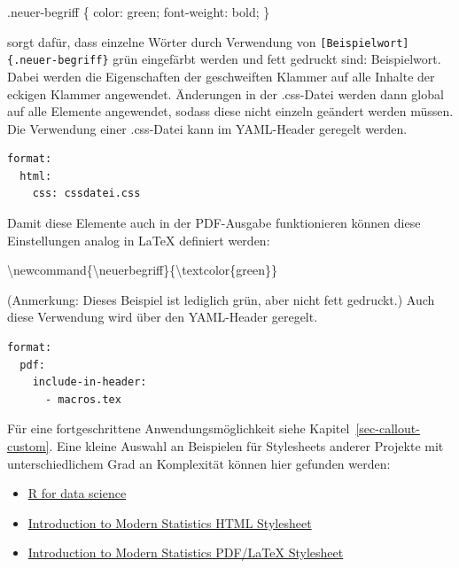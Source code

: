 \documentclass[
  letterpaper,
  DIV=11]{scrartcl}
\newenvironment{Shaded}{\begin{snugshade}}{\end{snugshade}}
\newcommand{\CharTok}[1]{\textcolor[rgb]{0.13,0.47,0.30}{#1}}
\newcommand{\ConstantTok}[1]{\textcolor[rgb]{0.56,0.35,0.01}{#1}}
\newcommand{\DecValTok}[1]{\textcolor[rgb]{0.68,0.00,0.00}{#1}}
\newcommand{\ExtensionTok}[1]{\textcolor[rgb]{0.00,0.23,0.31}{#1}}
\newcommand{\FunctionTok}[1]{\textcolor[rgb]{0.28,0.35,0.67}{#1}}
\newcommand{\KeywordTok}[1]{\textcolor[rgb]{0.00,0.23,0.31}{#1}}
\newcommand{\NormalTok}[1]{\textcolor[rgb]{0.00,0.23,0.31}{#1}}
\newcommand{\OperatorTok}[1]{\textcolor[rgb]{0.37,0.37,0.37}{#1}}
\begin{document}
\begin{Shaded}
\begin{Highlighting}[]
\FunctionTok{.neuer{-}begriff}\NormalTok{ \{ }
    \KeywordTok{color}\CharTok{:} \ConstantTok{green}\OperatorTok{;} 
    \KeywordTok{font{-}weight}\CharTok{:} \DecValTok{bold}\OperatorTok{;} 
\NormalTok{\}}
\end{Highlighting}
\end{Shaded}

sorgt dafür, dass einzelne Wörter durch Verwendung von
\texttt{{[}Beispielwort{]}\{.neuer-begriff\}} grün eingefärbt werden und
fett gedruckt sind: {Beispielwort}. Dabei werden die Eigenschaften der
geschweiften Klammer auf alle Inhalte der eckigen Klammer angewendet.
Änderungen in der .css-Datei werden dann global auf alle Elemente
angewendet, sodass diese nicht einzeln geändert werden müssen. Die
Verwendung einer .css-Datei kann im YAML-Header geregelt werden.

\begin{verbatim}
format:
  html: 
    css: cssdatei.css
\end{verbatim}

Damit diese Elemente auch in der PDF-Ausgabe funktionieren können diese
Einstellungen analog in LaTeX definiert werden:

\begin{Shaded}
\begin{Highlighting}[]
\FunctionTok{\textbackslash{}newcommand}\NormalTok{\{}\ExtensionTok{\textbackslash{}neuerbegriff}\NormalTok{\}\{}\FunctionTok{\textbackslash{}textcolor}\NormalTok{\{green\}\}}
\end{Highlighting}
\end{Shaded}

(Anmerkung: Dieses Beispiel ist lediglich grün, aber nicht fett
gedruckt.) Auch diese Verwendung wird über den YAML-Header geregelt.

\begin{verbatim}
format:
  pdf: 
    include-in-header:
      - macros.tex
\end{verbatim}

Für eine fortgeschrittene Anwendungsmöglichkeit siehe
Kapitel~\ref{sec-callout-custom}. Eine kleine Auswahl an Beispielen für
Stylesheets anderer Projekte mit unterschiedlichem Grad an Komplexität
können hier gefunden werden:

\begin{itemize}
\item
  \href{https://github.com/hadley/r4ds/blob/main/r4ds.scss}{R for data
  science}
\item
  \href{https://github.com/OpenIntroStat/ims/blob/main/scss/ims-style.scss}{Introduction
  to Modern Statistics HTML Stylesheet}
\item
  \href{https://github.com/OpenIntroStat/ims/blob/main/latex/ims-style.tex}{Introduction
  to Modern Statistics PDF/LaTeX Stylesheet}
\end{itemize}
\end{document}
